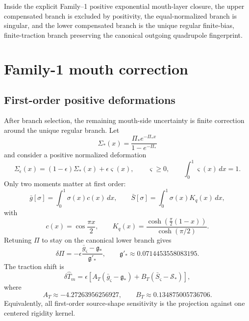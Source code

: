 \begin{theorem}
\label{thm:part04-unique-regular-mouth-branch}
Inside the explicit Family--1 positive exponential mouth-layer closure, the upper compensated branch is excluded by positivity, the equal-normalized branch is singular, and the lower compensated branch is the unique regular finite-bias, finite-traction branch preserving the canonical outgoing quadrupole fingerprint.
\end{theorem}

\section{Family-1 mouth correction}
\label{sec:part04_geometry_retarded_mouth:family-1-mouth-correction}

\subsection{First-order positive deformations}
\label{subsec:part04-positive-deformations}

After branch selection, the remaining mouth-side uncertainty is finite correction around the unique regular branch.  Let
\begin{equation}
\Sigma_*(x)=\frac{\Pi_*e^{-\Pi_*x}}{1-e^{-\Pi_*}}
\end{equation}
and consider a positive normalized deformation
\begin{equation}
\label{eq:part04-positive-deformation-family}
\Sigma_\epsilon(x)=(1-\epsilon)\Sigma_*(x)+\epsilon\varsigma(x),
\qquad
\varsigma\ge0,
\qquad
\int_0^1\varsigma(x)\,dx=1.
\end{equation}
Only two moments matter at first order:
\begin{equation}
\label{eq:part04-gbar-Sbar}
\bar g[\sigma]=\int_0^1\sigma(x)c(x)\,dx,
\qquad
\bar S[\sigma]=\int_0^1\sigma(x)K_q(x)\,dx,
\end{equation}
with
\begin{equation}
\label{eq:part04-c-Kq}
c(x)=\cos\frac{\pi x}{2},
\qquad
K_q(x)=\frac{\cosh\left(\frac{\pi}{2}(1-x)\right)}{\cosh(\pi/2)}.
\end{equation}
Retuning \(\Pi\) to stay on the canonical lower branch gives
\begin{equation}
\label{eq:part04-deltaPi-firstorder}
\delta\Pi
=-\epsilon\frac{\bar g_\varsigma-\mathfrak g_*}{\mathfrak g'_*},
\qquad
\mathfrak g'_*\approx0.0714453558083195.
\end{equation}
The traction shift is
\begin{equation}
\label{eq:part04-deltaT-firstorder}
\delta\widehat T_m
=
\epsilon\left[
A_T(\bar g_\varsigma-\mathfrak g_*)
+B_T(\bar S_\varsigma-\mathcal S_*)
\right],
\end{equation}
where
\begin{equation}
\label{eq:part04-AT-BT-values}
A_T\approx-4.27263956256927,
\qquad
B_T\approx0.134875005736706.
\end{equation}
Equivalently, all first-order source-shape sensitivity is the projection against one centered rigidity kernel.

